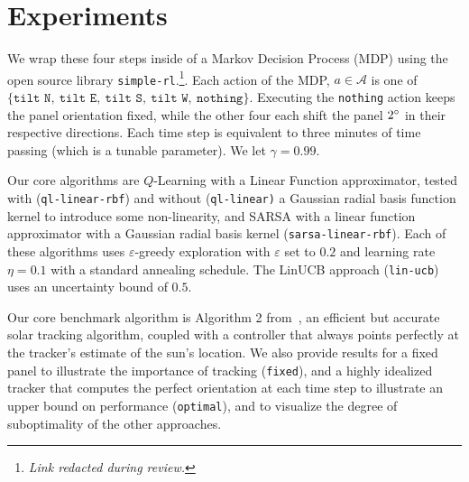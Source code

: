 \documentclass{article}
\newcommand{\mc}{\mathcal}
\begin{document}
{%
\section{Experiments}

We wrap these four steps inside of a Markov Decision Process (MDP) using the open source library \texttt{simple-rl}.\footnote{{\it Link redacted during review.}}. Each action of the MDP, $a \in \mc{A}$ is one of $\{\texttt{tilt N},\ \texttt{tilt E},\ \texttt{tilt S},\ \texttt{tilt W},\ \texttt{nothing}\}$. Executing the \texttt{nothing} action keeps the panel orientation fixed, while the other four each shift the panel $2\degree$ in their respective directions. Each time step is equivalent to three minutes of time passing (which is a tunable parameter). We let $\gamma=0.99$.

Our core algorithms are $Q$-Learning with a Linear Function approximator, tested with (\texttt{ql-linear-rbf}) and without (\texttt{ql-linear)} a Gaussian radial basis function kernel to introduce some non-linearity, and SARSA with a linear function approximator with a Gaussian radial basis kernel (\texttt{sarsa-linear-rbf}). Each of these algorithms uses $\varepsilon$-greedy exploration with $\varepsilon$ set to $0.2$ and learning rate $\eta = 0.1$ with a standard annealing schedule. The LinUCB approach (\texttt{lin-ucb}) uses an uncertainty bound of $0.5$.

Our core benchmark algorithm is Algorithm 2 from~\citet{Grena2012}, an efficient but accurate solar tracking algorithm, coupled with a controller that always points perfectly at the tracker's estimate of the sun's location. We also provide results for a fixed panel to illustrate the importance of tracking (\texttt{fixed}), and a highly idealized tracker that computes the perfect orientation at each time step to illustrate an upper bound on performance (\texttt{optimal}), and to visualize the degree of suboptimality of the other approaches.

}
\end{document}
